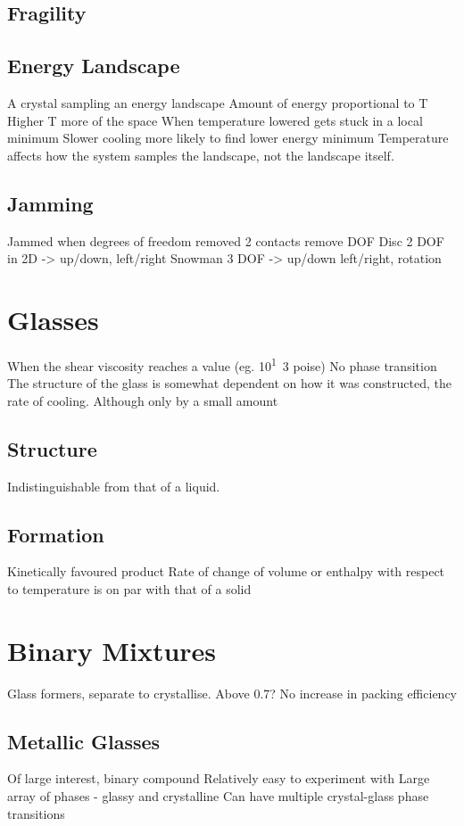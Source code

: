 \subsection{Fragility}

\subsection{Energy Landscape}
A crystal sampling an energy landscape
Amount of energy proportional to T
Higher T more of the space
When temperature lowered gets stuck in a local minimum
Slower cooling more likely to find lower energy minimum
Temperature affects how the system samples the landscape, not the landscape itself.

\subsection{Jamming}
Jammed when degrees of freedom removed
2 contacts remove DOF
Disc 2 DOF in 2D -> up/down, left/right
Snowman 3 DOF -> up/down left/right, rotation


\section{Glasses}
When the shear viscosity reaches a value (eg. \si{10^13} poise)
No phase transition
The structure of the glass is somewhat dependent on how it was constructed, the rate of cooling.
Although only by a small amount

\subsection{Structure}
Indistinguishable from that of a liquid.


\subsection{Formation}
Kinetically favoured product
Rate of change of volume or enthalpy with respect to temperature is on par with that of a solid

\section{Binary Mixtures}
Glass formers, separate to crystallise. Above 0.7? No increase in packing efficiency

\subsection{Metallic Glasses}
Of large interest, binary compound
Relatively easy to experiment with
Large array of phases - glassy and crystalline
Can have multiple crystal-glass phase transitions



